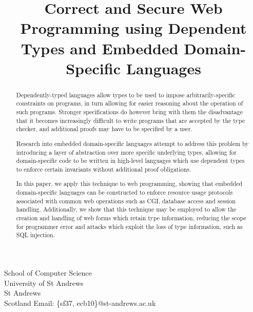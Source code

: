 \documentclass[preprint]{sigplanconf}
\begin{document}
\newcommand{\idris}{\textsc{Idris}}
\setlength{\pdfpageheight}{\paperheight}
\setlength{\pdfpagewidth}{\paperwidth}





\preprintfooter{}   %

\title{Correct and Secure Web Programming using Dependent Types and Embedded Domain-Specific Languages}

           {School of Computer Science \\ University of St Andrews \\ St Andrews \\ Scotland}
           {Email: \{sf37, ecb10\}@st-andrews.ac.uk}

\maketitle

\begin{abstract}
Dependently-typed languages allow types to be used to impose arbitrarily-specific constraints on programs, in turn allowing for easier reasoning about the operation of such programs. Stronger specifications do however bring with them the disadvantage that it becomes increasingly difficult to write programs that are accepted by the type checker, and additional proofs may have to be specified by a user.

Research into embedded domain-specific languages attempt to address this problem by introducing a layer of abstraction over more specific underlying types, allowing for domain-specific code to be written in high-level languages which use dependent types to enforce certain invariants without additional proof obligations. 

In this paper, we apply this technique to web programming, showing that embedded domain-specific languages can be constructed to enforce resource usage protocols associated with common web operations such as CGI, database access and session handling. Additionally, we show that this technique may be employed to allow the creation and handling of web forms which retain type information, reducing the scope for programmer error and attacks which exploit the loss of type information, such as SQL injection.
\end{abstract}
\end{document}

